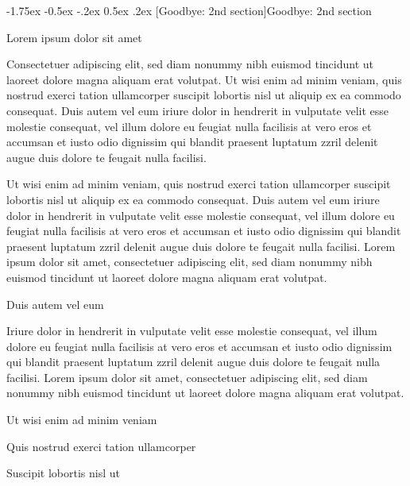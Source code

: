 \documentclass[11pt,twoside]{article}\makeatletter
\makeatletter
\renewcommand\section{\@startsection {section}{1}{\z@}%
     {-1.75ex \@plus -0.5ex \@minus -.2ex}%
     {0.5ex \@plus .2ex}%
     {\reset@font\Large\bfseries\sffamily}}
\makeatother
\begin{document}
\section[{Goodbye: 2nd section}]{Goodbye: 2nd section}\label{part2}\par
Lorem ipsum dolor sit amet\par
Consectetuer adipiscing elit, sed diam nonummy nibh euismod tincidunt ut laoreet dolore magna aliquam erat volutpat. Ut wisi enim ad minim veniam, quis nostrud exerci tation ullamcorper suscipit lobortis nisl ut aliquip ex ea commodo consequat. Duis autem vel eum iriure dolor in hendrerit in vulputate velit esse molestie consequat, vel illum dolore eu feugiat nulla facilisis at vero eros et accumsan et iusto odio dignissim qui blandit praesent luptatum zzril delenit augue duis dolore te feugait nulla facilisi.\par
Ut wisi enim ad minim veniam, quis nostrud exerci tation ullamcorper suscipit lobortis nisl ut aliquip ex ea commodo consequat. Duis autem vel eum iriure dolor in hendrerit in vulputate velit esse molestie consequat, vel illum dolore eu feugiat nulla facilisis at vero eros et accumsan et iusto odio dignissim qui blandit praesent luptatum zzril delenit augue duis dolore te feugait nulla facilisi. Lorem ipsum dolor sit amet, consectetuer adipiscing elit, sed diam nonummy nibh euismod tincidunt ut laoreet dolore magna aliquam erat volutpat. \par
Duis autem vel eum \par
Iriure dolor in hendrerit in vulputate velit esse molestie consequat, vel illum dolore eu feugiat nulla facilisis at vero eros et accumsan et iusto odio dignissim qui blandit praesent luptatum zzril delenit augue duis dolore te feugait nulla facilisi. Lorem ipsum dolor sit amet, consectetuer adipiscing elit, sed diam nonummy nibh euismod tincidunt ut laoreet dolore magna aliquam erat volutpat. \par
Ut wisi enim ad minim veniam\par
Quis nostrud exerci tation ullamcorper \par
Suscipit lobortis nisl ut 
\end{document}
